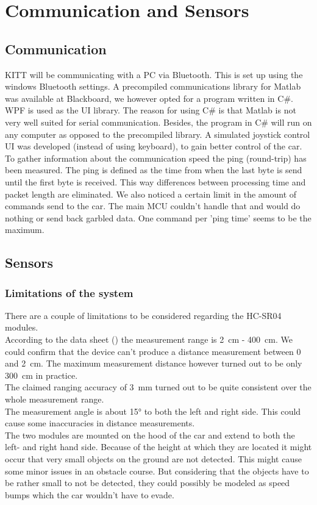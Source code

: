 \documentclass[final]{scrreprt} %
\begin{document}
\chapter{Communication and Sensors}
\section{Communication}
KITT will be communicating with a PC via Bluetooth. 
This is set up using the windows Bluetooth settings.
A precompiled communications library for Matlab was available at Blackboard, we however opted for a program written in C\#.
WPF is used as the UI library.
The reason for using C\# is that Matlab is not very well suited for serial communication.
Besides, the program in C\# will run on any computer as opposed to the precompiled library. 
A simulated joystick control UI was developed (instead of using keyboard), to gain better control of the car.
\\
To gather information about the communication speed the ping (round-trip) has been measured. 
The ping is defined as the time from when the last byte is send until the first byte is received.
This way differences between processing time and packet length are eliminated.
We also noticed a certain limit in the amount of commands send to the car.
The main MCU couldn't handle that and would do nothing or send back garbled data.
One command per 'ping time' seems to be the maximum.

\section{Sensors}
\subsection{Limitations of the system}

There are a couple of limitations to be considered regarding the HC-SR04 modules.\\
According to the data sheet (\cite{HC-SR04}) the measurement range is \SI{2}{\centi\metre} - \SI{400}{\centi\metre}. 
We could confirm that the device can't produce a distance measurement between 0 and \SI{2}{\centi\metre}. 
The maximum measurement distance however turned out to be only \SI{300}{\centi\metre} in practice.\\ 
The claimed ranging accuracy of \SI{3}{\milli\metre} turned out to be quite consistent over the whole measurement range.\\
The measurement angle is about \ang{15} to both the left and right side. 
This could cause some inaccuracies in distance measurements.\\
The two modules are mounted on the hood of the car and extend to both the left- and right hand side. 
Because of the height at which they are located it might occur that very small objects on the ground are not detected. 
This might cause some minor issues in an obstacle course. 
But considering that the objects have to be rather small to not be detected, they could possibly be modeled as speed bumps which the car wouldn't have to evade.
\end{document}
